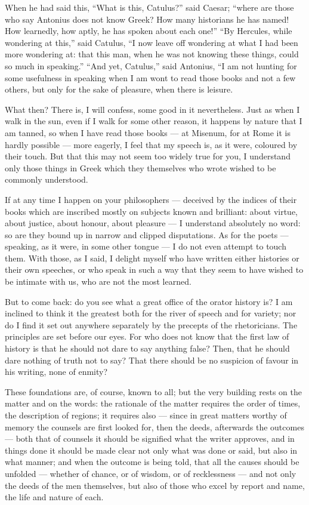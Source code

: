  When he had said this, ``What is this, Catulus?'' said Caesar; ``where are those who say Antonius does not know Greek? How many historians he has named! How learnedly, how aptly, he has spoken about each one!'' ``By Hercules, while wondering at this,'' said Catulus, ``I now leave off wondering at what I had been more wondering at: that this man, when he was not knowing these things, could so much in speaking.'' ``And yet, Catulus,'' said Antonius, ``I am not hunting for some usefulness in speaking when I am wont to read those books and not a few others, but only for the sake of pleasure, when there is leisure.

 What then? There is, I will confess, some good in it nevertheless. Just as when I walk in the sun, even if I walk for some other reason, it happens by nature that I am tanned, so when I have read those books — at Misenum, for at Rome it is hardly possible — more eagerly, I feel that my speech is, as it were, coloured by their touch. But that this may not seem too widely true for you, I understand only those things in Greek which they themselves who wrote wished to be commonly understood.

 If at any time I happen on your philosophers — deceived by the indices of their books which are inscribed mostly on subjects known and brilliant: about virtue, about justice, about honour, about pleasure — I understand absolutely no word: so are they bound up in narrow and clipped disputations. As for the poets — speaking, as it were, in some other tongue — I do not even attempt to touch them. With those, as I said, I delight myself who have written either histories or their own speeches, or who speak in such a way that they seem to have wished to be intimate with us, who are not the most learned.

 But to come back: do you see what a great office of the orator history is? I am inclined to think it the greatest both for the river of speech and for variety; nor do I find it set out anywhere separately by the precepts of the rhetoricians. The principles are set before our eyes. For who does not know that the first law of history is that he should not dare to say anything false? Then, that he should dare nothing of truth not to say? That there should be no suspicion of favour in his writing, none of enmity?

 These foundations are, of course, known to all; but the very building rests on the matter and on the words: the rationale of the matter requires the order of times, the description of regions; it requires also — since in great matters worthy of memory the counsels are first looked for, then the deeds, afterwards the outcomes — both that of counsels it should be signified what the writer approves, and in things done it should be made clear not only what was done or said, but also in what manner; and when the outcome is being told, that all the causes should be unfolded — whether of chance, or of wisdom, or of recklessness — and not only the deeds of the men themselves, but also of those who excel by report and name, the life and nature of each.

